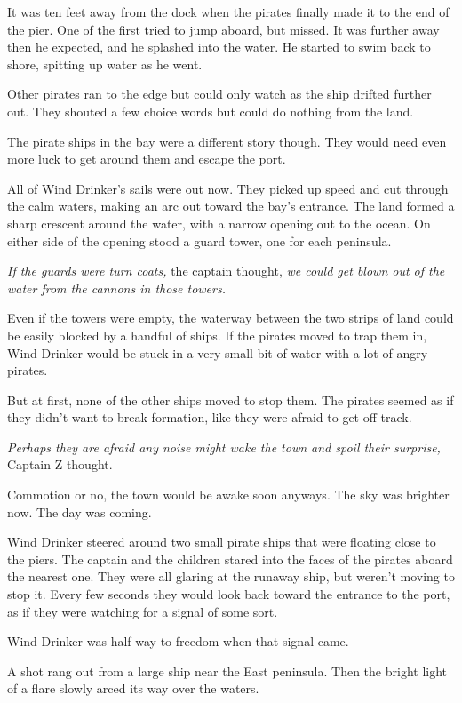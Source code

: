 \documentclass[12pt]{extbook}
\begin{document}
  It was ten feet away from the dock when the pirates finally made it to
  the end of the pier. One of the first tried to jump aboard, but missed.
  It was further away then he expected, and he splashed into the water. He
  started to swim back to shore, spitting up water as he went.
  
  Other pirates ran to the edge but could only watch as the ship drifted
  further out. They shouted a few choice words but could do nothing from
  the land.
  
  The pirate ships in the bay were a different story though. They would
  need even more luck to get around them and escape the port.
  
  All of Wind Drinker's sails were out now. They picked up speed and cut
  through the calm waters, making an arc out toward the bay's entrance.
  The land formed a sharp crescent around the water, with a narrow opening
  out to the ocean. On either side of the opening stood a guard tower, one
  for each peninsula.
  
  \emph{If the guards were turn coats,} the captain thought, \emph{we
  could get blown out of the water from the cannons in those towers.}
  
  Even if the towers were empty, the waterway between the two strips of
  land could be easily blocked by a handful of ships. If the pirates moved
  to trap them in, Wind Drinker would be stuck in a very small bit of
  water with a lot of angry pirates.
  
  But at first, none of the other ships moved to stop them. The pirates
  seemed as if they didn't want to break formation, like they were afraid
  to get off track.
  
  \emph{Perhaps they are afraid any noise might wake the town and spoil
  their surprise,} Captain Z thought.
  
  Commotion or no, the town would be awake soon anyways. The sky was
  brighter now. The day was coming.
  
  Wind Drinker steered around two small pirate ships that were floating
  close to the piers. The captain and the children stared into the faces
  of the pirates aboard the nearest one. They were all glaring at the
  runaway ship, but weren't moving to stop it. Every few seconds they
  would look back toward the entrance to the port, as if they were
  watching for a signal of some sort.
  
  Wind Drinker was half way to freedom when that signal came.
  
  A shot rang out from a large ship near the East peninsula. Then the
  bright light of a flare slowly arced its way over the waters.
  
\end{document}
